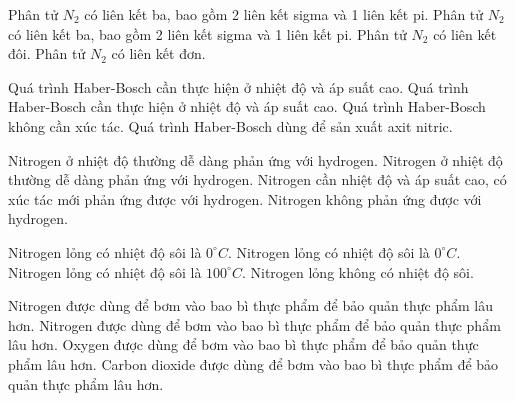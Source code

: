 \begin{ex}
	Phân tử $N_2$ có liên kết ba, bao gồm 2 liên kết sigma và 1 liên kết pi.
	{Phân tử $N_2$ có liên kết ba, bao gồm 2 liên kết sigma và 1 liên kết pi.}
	{Phân tử $N_2$ có liên kết đôi.}
	{Phân tử $N_2$ có liên kết đơn.}
\end{ex}

\begin{ex}
	Quá trình Haber-Bosch cần thực hiện ở nhiệt độ và áp suất cao.
	{\True Quá trình Haber-Bosch cần thực hiện ở nhiệt độ và áp suất cao.}
	{Quá trình Haber-Bosch không cần xúc tác.}
	{Quá trình Haber-Bosch dùng để sản xuất axit nitric.}

\end{ex}

\begin{ex}
	Nitrogen ở nhiệt độ thường dễ dàng phản ứng với hydrogen.
	{Nitrogen ở nhiệt độ thường dễ dàng phản ứng với hydrogen.}
	{\True  Nitrogen cần nhiệt độ và áp suất cao, có xúc tác mới phản ứng được với hydrogen.}
	{Nitrogen không phản ứng được với hydrogen.}
\end{ex}

\begin{ex}
	Nitrogen lỏng có nhiệt độ sôi là $0^\circ C$.
	{Nitrogen lỏng có nhiệt độ sôi là $0^\circ C$.}
	{Nitrogen lỏng có nhiệt độ sôi là $100^\circ C$.}
	{Nitrogen lỏng không có nhiệt độ sôi.}

\end{ex}

\begin{ex}
	Nitrogen được dùng để bơm vào bao bì thực phẩm để bảo quản thực phẩm lâu hơn.
	{\True Nitrogen được dùng để bơm vào bao bì thực phẩm để bảo quản thực phẩm lâu hơn.}
	{Oxygen được dùng để bơm vào bao bì thực phẩm để bảo quản thực phẩm lâu hơn.}
	{Carbon dioxide được dùng để bơm vào bao bì thực phẩm để bảo quản thực phẩm lâu hơn.}
\end{ex}

